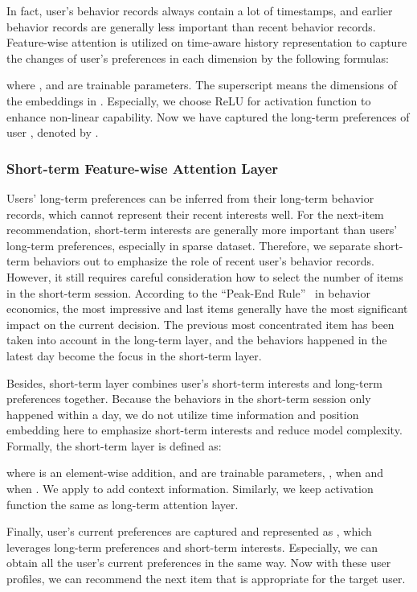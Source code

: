 \documentclass[preprint,12pt]{elsarticle}
\begin{document}
\begin{sloppypar}
In fact, user's behavior records always contain a lot of timestamps, and earlier behavior records are generally less important than recent behavior records. Feature-wise attention is utilized on time-aware history representation  to capture the changes of user's preferences in each dimension by the following formulas:



where , and  are trainable parameters. The superscript  means the dimensions of the embeddings in . Especially, we choose ReLU for activation function  to enhance non-linear capability. Now we have captured the long-term preferences of user , denoted by .

\subsubsection{Short-term Feature-wise Attention Layer}

Users' long-term preferences can be inferred from their long-term behavior records, which cannot represent their recent interests well. For the next-item recommendation, short-term interests are generally more important than users' long-term preferences, especially in sparse dataset. Therefore, we separate short-term behaviors out to emphasize the role of recent user's behavior records. However, it still requires careful consideration how to select the number of items in the short-term session. According to the ``Peak-End Rule''~\cite{do2008evaluations} in behavior economics, the most impressive and last items generally have the most significant impact on the current decision. The previous most concentrated item has been taken into account in the long-term layer, and the behaviors happened in the latest day become the focus in the short-term layer.

Besides, short-term layer combines user's short-term interests and long-term preferences together. Because the behaviors in the short-term session only happened within a day, we do not utilize time information and position embedding here to emphasize short-term interests and reduce model complexity. Formally, the short-term layer is defined as:



where  is an element-wise addition,  and  are trainable parameters, ,  when  and  when . We apply  to add context information. Similarly, we keep activation function the same as long-term attention layer.

Finally, user's current preferences are captured and represented as , which leverages long-term preferences and short-term interests. Especially, we can obtain all the user's current preferences in the same way. Now with these user profiles, we can recommend the next item that is appropriate for the target user.


\end{sloppypar}
\end{document}
